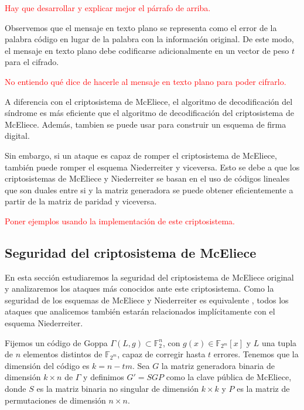 \textcolor{red}{Hay que desarrollar y explicar mejor el párrafo de arriba.}

Observemos que el mensaje en texto plano se representa como el error de la palabra código en lugar de la palabra con la información original. De este modo, el mensaje en texto plano debe codificarse adicionalmente en un vector de peso $t$ para el cifrado.

\textcolor{red}{No entiendo qué dice de hacerle al mensaje en texto plano para poder cifrarlo.}

A diferencia con el criptosistema de McEliece, el algoritmo de decodificación del síndrome es más eficiente que el algoritmo de decodificación del criptosistema de McEliece. Además, tambien se puede usar para construir un esquema de firma digital.

Sin embargo, si un ataque es capaz de romper el criptosistema de McEliece, también puede romper el esquema Niederreiter y viceversa. Esto se debe a que los criptosistemas de McEliece y Niederreiter se basan en el uso de códigos lineales que son duales entre si y la matriz generadora se puede obtener eficientemente a partir de la matriz de paridad y viceversa.

\textcolor{red}{Poner ejemplos usando la implementación de este criptosistema.}


\subsection{Seguridad del criptosistema de McEliece}

En esta sección estudiaremos la seguridad del criptosistema de McEliece original y analizaremos los ataques más conocidos ante este criptosistema. Como la seguridad de los esquemas de McEliece y Niederreiter es equivalente \cite{Equivalence_McEliece_Niederreiter}, todos los ataques que analicemos también estarán relacionados implícitamente con el esquema Niederreiter.

Fijemos un código de Goppa $\Gamma(L, g) \subset \mathbb{F}_2^n$, con $g(x) \in \mathbb{F}_{2^m}[x]$ y $L$ una tupla de $n$ elementos distintos de $\mathbb{F}_{2^m}$, capaz de corregir hasta $t$ errores. Tenemos que la dimensión del código es $k = n - tm$. Sea $G$ la matriz generadora binaria de dimensión $k \times n$ de $\Gamma$ y definimos $G' = SGP$ como la clave pública de McEliece, donde $S$ es la matriz binaria no singular de dimensión $k \times k$ y $P$ es la matriz de permutaciones de dimensión $n \times n$.


